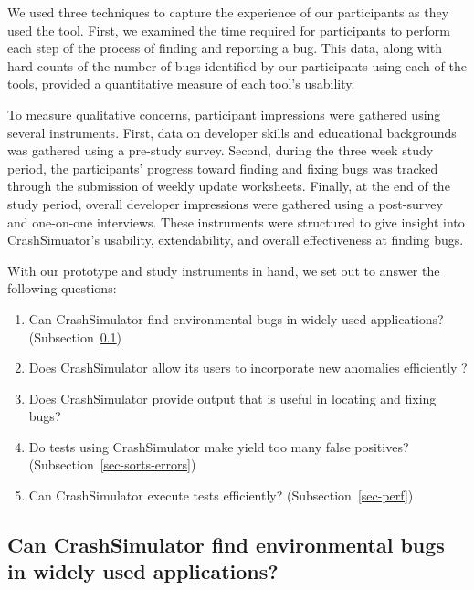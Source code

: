 We used three techniques to capture the experience of our participants as
they used the tool.  First, we examined the time required for participants
to perform each step of the process of finding and reporting a bug.
This data, along with hard counts of the number of bugs identified by our
participants using each of the tools, provided a quantitative measure of
each tool's usability.

To measure qualitative concerns,
participant impressions were gathered using
several instruments.  First, data on developer skills and educational
backgrounds was gathered using a pre-study survey.
Second, during the three week
study period, the participants' progress toward finding and fixing bugs was
tracked through the submission of weekly update worksheets.  Finally, at
the end of the study period, overall developer impressions were gathered
using a post-survey and one-on-one interviews.  These instruments were
structured to give insight into CrashSimuator's usability, extendability, and
overall effectiveness at finding bugs.

With our prototype and study instruments in hand, we
set out to answer the following questions:

\begin{enumerate}

\item{Can CrashSimulator find environmental bugs in widely used applications?
(Subsection~\ref{sec-env-bugs})}

\item{Does CrashSimulator allow its users to incorporate new anomalies
      efficiently ?}

\item Does CrashSimulator provide output that is useful in locating and
fixing bugs?

\item{Do tests using CrashSimulator make yield too many false positives?
      (Subsection~\ref{sec-sorts-errors})}

\item{Can CrashSimulator
      execute tests efficiently? (Subsection~\ref{sec-perf})}

\end{enumerate}

\subsection{Can CrashSimulator find environmental bugs in widely used
applications?}
\label{sec-env-bugs}

